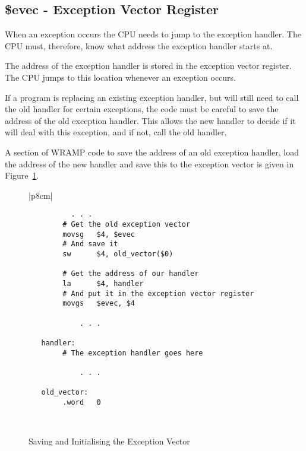 \subsection{\$evec - Exception Vector Register}
\label{sec:evec}

When an exception occurs the CPU needs to jump to the exception
handler. The CPU must, therefore, know what address the exception
handler starts at.

The address of the exception handler is stored in the exception vector
register. The CPU jumps to this location whenever an exception occurs.

If a program is replacing an existing exception handler, but will still
need to call the old handler for certain exceptions, the code must
be careful to save the address of the old exception handler. This
allows the new handler to decide if it will deal with this exception,
and if not, call the old handler.

A section of WRAMP code to save the address of an old exception
handler, load the address of the new handler and save this to the
exception vector is given in Figure~\ref{code:evec}.

\begin{figure}[h]
\begin{footnotesize}
\begin{center}
\begin{tabular}{|p{8cm}|}
\hline
\begin{verbatim}
          . . . 
        # Get the old exception vector
        movsg   $4, $evec
        # And save it
        sw      $4, old_vector($0)

        # Get the address of our handler
        la      $4, handler
        # And put it in the exception vector register
        movgs   $evec, $4

            . . .
    
   handler:
        # The exception handler goes here

            . . .

   old_vector:
        .word   0

\end{verbatim}
\\
\hline
\end{tabular}
\end{center}
\end{footnotesize}
\caption{Saving and Initialising the Exception Vector}
\label{code:evec}
\end{figure}

